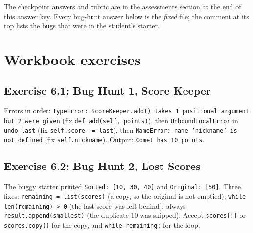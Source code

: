 
\begin{teachernote}
The checkpoint answers and rubric are in the assessments section at the end of this answer key. Every bug-hunt answer below is the \emph{fixed} file; the comment at its top lists the bugs that were in the student's starter.
\end{teachernote}

\section{Workbook exercises}
\subsection{Exercise 6.1: Bug Hunt 1, Score Keeper}
\begin{answer}
Errors in order: \texttt{TypeError: ScoreKeeper.add() takes 1 positional argument but 2 were given} (fix \texttt{def add(self, points)}), then \texttt{UnboundLocalError} in \texttt{undo\_last} (fix \texttt{self.score -= last}), then \texttt{NameError: name 'nickname' is not defined} (fix \texttt{self.nickname}). Output: \texttt{Comet has 10 points}.
\end{answer}

\subsection{Exercise 6.2: Bug Hunt 2, Lost Scores}
\begin{answer}
The buggy starter printed \texttt{Sorted: [10, 30, 40]} and \texttt{Original: [50]}. Three fixes: \texttt{remaining = list(scores)} (a copy, so the original is not emptied); \texttt{while len(remaining) > 0} (the last score was left behind); always \texttt{result.append(smallest)} (the duplicate 10 was skipped).
Accept \texttt{scores[:]} or \texttt{scores.copy()} for the copy, and \texttt{while remaining:} for the loop.
\end{answer}

